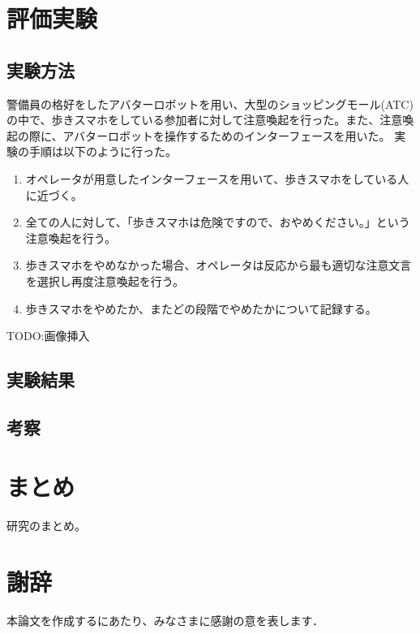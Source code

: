 \documentclass[11pt,a4j]{jreport}
\begin{document}


\chapter{評価実験}
\section{実験方法}
警備員の格好をしたアバターロボットを用い、大型のショッピングモール(ATC)の中で、歩きスマホをしている参加者に対して注意喚起を行った。また、注意喚起の際に、アバターロボットを操作するためのインターフェースを用いた。
実験の手順は以下のように行った。
\begin{enumerate}
  \item オペレータが用意したインターフェースを用いて、歩きスマホをしている人に近づく。
  \item 全ての人に対して、「歩きスマホは危険ですので、おやめください。」という注意喚起を行う。
  \item 歩きスマホをやめなかった場合、オペレータは反応から最も適切な注意文言を選択し再度注意喚起を行う。
  \item 歩きスマホをやめたか、またどの段階でやめたかについて記録する。
\end{enumerate}
TODO:画像挿入
\section{実験結果}
\section{考察}

\chapter{まとめ}
研究のまとめ。

\chapter*{謝辞} %
本論文を作成するにあたり、みなさまに感謝の意を表します．


\renewcommand{\bibname}{参考文献} %
\end{document}
